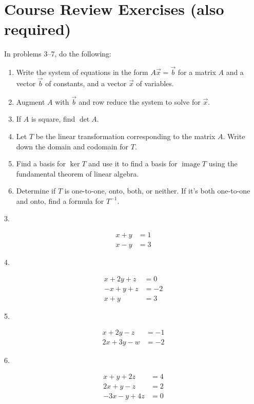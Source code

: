 \documentclass{article}
\begin{document}
\section{Course Review Exercises (also required)}

In problems 3--7, do the following:

\begin{enumerate}

	\item Write the system of equations in the form $A\vec{x} = \vec{b}$ for a matrix $A$ and a vector $\vec{b}$ of constants, and a vector $\vec{x}$ of variables.

	\item Augment $A$ with $\vec{b}$ and row reduce the system to solve for $\vec{x}$.

	\item If $A$ is square, find $\det A$.

	\item Let $T$ be the linear transformation corresponding to the matrix $A$. Write down the domain and codomain for $T$.

	\item Find a basis for $\ker T$ and use it to find a basis for $\operatorname{image} T$ using the fundamental theorem of linear algebra.

	\item Determine if $T$ is one-to-one, onto, both, or neither. If it's both one-to-one and onto, find a formula for $T^{-1}$.

\end{enumerate}

3.

\begin{align*}
	x + y &= 1\\
	x - y &= 3
\end{align*}

4.

\begin{align*}
	x + 2y + z &= 0\\
	-x + y + z &= -2\\
	x + y &= 3
\end{align*}

5.

\begin{align*}
	x + 2y - z &= -1\\
	2x + 3y - w &= -2
\end{align*}

6.

\begin{align*}
	x + y + 2z &= 4\\
	2x + y - z &= 2\\
	-3x - y + 4z &= 0
\end{align*}
\end{document}
